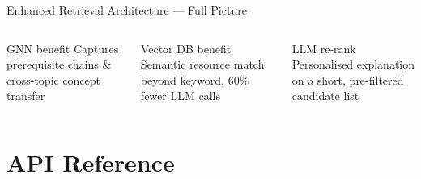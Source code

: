 \documentclass[aspectratio=169,9pt]{beamer}
\begin{document}
\begin{frame}{Enhanced Retrieval Architecture — Full Picture}

\vspace{0.3cm}
\begin{columns}
  \begin{block}{\small GNN benefit}
    \small Captures prerequisite chains \& cross-topic concept transfer
  \end{block}
  \begin{block}{\small Vector DB benefit}
    \small Semantic resource match beyond keyword, 60\% fewer LLM calls
  \end{block}
  \begin{block}{\small LLM re-rank}
    \small Personalised explanation on a short, pre-filtered candidate list
  \end{block}
\end{columns}
\end{frame}

\section{API Reference}
\end{document}
